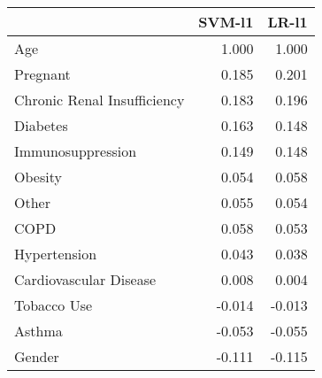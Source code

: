 \begin{tabular}{lrr}
\toprule
{} &  SVM-l1 &  LR-l1 \\
\midrule
Age                         &   1.000 &  1.000 \\
Pregnant                    &   0.185 &  0.201 \\
Chronic Renal Insufficiency &   0.183 &  0.196 \\
Diabetes                    &   0.163 &  0.148 \\
Immunosuppression           &   0.149 &  0.148 \\
Obesity                     &   0.054 &  0.058 \\
Other                       &   0.055 &  0.054 \\
COPD                        &   0.058 &  0.053 \\
Hypertension                &   0.043 &  0.038 \\
Cardiovascular Disease      &   0.008 &  0.004 \\
Tobacco Use                 &  -0.014 & -0.013 \\
Asthma                      &  -0.053 & -0.055 \\
Gender                      &  -0.111 & -0.115 \\
\bottomrule
\end{tabular}
